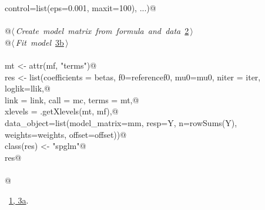 \documentclass[reqno]{amsart}
\renewcommand{\NWlink}[2]{\hyperlink{#1}{#2}}
\begin{document}
\begin{flushleft}
\begin{list}{}{}
\mbox{}\verb@                  control=list(eps=0.001, maxit=100), ...){@\\
\mbox{}\verb@@\\
\mbox{}\verb@    @\hbox{$\langle\,${\itshape Create model matrix from formula and data}\nobreak\ {\footnotesize \NWlink{nuweb2}{2}}$\,\rangle$}\verb@@\\
\mbox{}\verb@    @\hbox{$\langle\,${\itshape Fit model}\nobreak\ {\footnotesize \NWlink{nuweb3b}{3b}}$\,\rangle$}\verb@@\\
\mbox{}\verb@@\\
\mbox{}\verb@    mt <- attr(mf, "terms")@\\
\mbox{}\verb@    res <- list(coefficients = betas, f0=referencef0, mu0=mu0, niter = iter, loglik=llik,@\\
\mbox{}\verb@                link = link, call = mc, terms = mt,@\\
\mbox{}\verb@                xlevels = .getXlevels(mt, mf),@\\
\mbox{}\verb@                data_object=list(model_matrix=mm, resp=Y, n=rowSums(Y), weights=weights, offset=offset))@\\
\mbox{}\verb@    class(res) <- "spglm"@\\
\mbox{}\verb@    res@\\
\mbox{}\verb@@\\
\mbox{}\verb@}@\\
\mbox{}\verb@@{\NWsep}
\end{list}
\vspace{-1.5ex}
\footnotesize
\begin{list}{}{\setlength{\itemsep}{-\parsep}\setlength{\itemindent}{-\leftmargin}}
\item \NWtxtFileDefBy\ \NWlink{nuweb1}{1}\NWlink{nuweb3a}{, 3a}.

\item{}
\end{list}
\vspace{4ex}
\end{flushleft}
\end{document}
